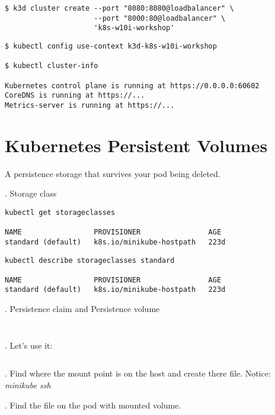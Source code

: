 \documentclass[12pt, letterpaper]{article}
\begin{document}
\begin{verbatim}
$ k3d cluster create --port "8080:8080@loadbalancer" \
                     --port "8000:80@loadbalancer" \
                     'k8s-w10i-workshop'
\end{verbatim}

\begin{verbatim}
$ kubectl config use-context k3d-k8s-w10i-workshop

$ kubectl cluster-info

Kubernetes control plane is running at https://0.0.0.0:60602
CoreDNS is running at https://...
Metrics-server is running at https://...
\end{verbatim}

\section{Kubernetes Persistent Volumes}

A persistence storage that survives your pod being deleted.

. Storage class

\begin{verbatim}
kubectl get storageclasses

NAME                 PROVISIONER                AGE
standard (default)   k8s.io/minikube-hostpath   223d
\end{verbatim}

\begin{verbatim}
kubectl describe storageclasses standard

NAME                 PROVISIONER                AGE
standard (default)   k8s.io/minikube-hostpath   223d
\end{verbatim}

. Persistence claim and Persistence volume

\inputminted[frame=single]{yaml}{manifests/persistentvolumes/pv.yaml}

\inputminted[frame=single]{yaml}{manifests/persistentvolumes/pvc.yaml}

. Let's use it:

\inputminted[frame=single]{yaml}{manifests/persistentvolumes/kube-deployment.yaml}

. Find where the mount point is on the host and create there file. Notice: \emph{minikube ssh}

. Find the file on the pod with mounted volume.
\end{document}
